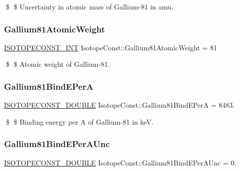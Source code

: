 \$ \$ Uncertainty in atomic mass of Gallium-\/81 in amu. \mbox{\label{group___isotope_const-_gallium-_ga81_ga0c818fa181ac93e2bf5d64a7c6d90453}} 
\subsubsection{\texorpdfstring{Gallium81\+Atomic\+Weight}{Gallium81AtomicWeight}}
{\footnotesize\ttfamily \mbox{\hyperlink{group___isotope_const-_macros_ga5f18360b3e99483a35c32d789e62621c}{I\+S\+O\+T\+O\+P\+E\+C\+O\+N\+S\+T\+\_\+\+I\+NT}} Isotope\+Const\+::\+Gallium81\+Atomic\+Weight = 81}

\$ \$ Atomic weight of Gallium-\/81. \mbox{\label{group___isotope_const-_gallium-_ga81_gab69fb0fd964a91ff8b02dea8e68110a1}} 
\subsubsection{\texorpdfstring{Gallium81\+Bind\+E\+PerA}{Gallium81BindEPerA}}
{\footnotesize\ttfamily \mbox{\hyperlink{group___isotope_const-_macros_ga8f45a7272ce02c0b4c65c44636ed719a}{I\+S\+O\+T\+O\+P\+E\+C\+O\+N\+S\+T\+\_\+\+D\+O\+U\+B\+LE}} Isotope\+Const\+::\+Gallium81\+Bind\+E\+PerA = 8483.}

\$ \$ Binding energy per A of Gallium-\/81 in keV. \mbox{\label{group___isotope_const-_gallium-_ga81_ga87d5881f39990a68a96053b283e8654f}} 
\subsubsection{\texorpdfstring{Gallium81\+Bind\+E\+Per\+A\+Unc}{Gallium81BindEPerAUnc}}
{\footnotesize\ttfamily \mbox{\hyperlink{group___isotope_const-_macros_ga8f45a7272ce02c0b4c65c44636ed719a}{I\+S\+O\+T\+O\+P\+E\+C\+O\+N\+S\+T\+\_\+\+D\+O\+U\+B\+LE}} Isotope\+Const\+::\+Gallium81\+Bind\+E\+Per\+A\+Unc = 0.}

